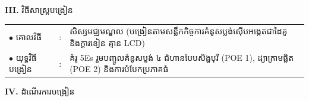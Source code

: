\documentclass[a4paper,10pt]{article}
\newcommand{\en}[1]{{\TimesEn #1}}
\begin{document}
{\vspace{2pt}

\textbf{III.} {\muol វិធីសាស្រ្តបង្រៀន}\\[1pt]
\hspace*{0.45cm}%
\begin{tabular}{@{}l l L{14.85cm}@{}}
  $\bullet$ \hspace{0.25cm} គោលវិធី & : & សិស្សមជ្ឈមណ្ឌល (បង្រៀនតាមសន្លឹកកិច្ចការគំនូសប្លង់ស៊ើបអង្កេតជាដៃគូ និងក្ដារខៀន គ្មាន \en{LCD}) \\
  $\bullet$ \hspace{0.25cm} យុទ្ធវិធីបង្រៀន & : & គំរូ \en{5Es} រួមបញ្ចូលគំនូសប្លង់ ៤ ជំហានបែបសិង្ហបុរី \en{(POE 1)}, ដ្យាក្រាមផ្លិត \en{(POE 2)} និងការបំបែកប្រភាគធំ \\
\end{tabular}
}

\vspace{2pt}

\textbf{IV.} {\muol ដំណើរការបង្រៀន}

\vspace{1pt}
\end{document}
